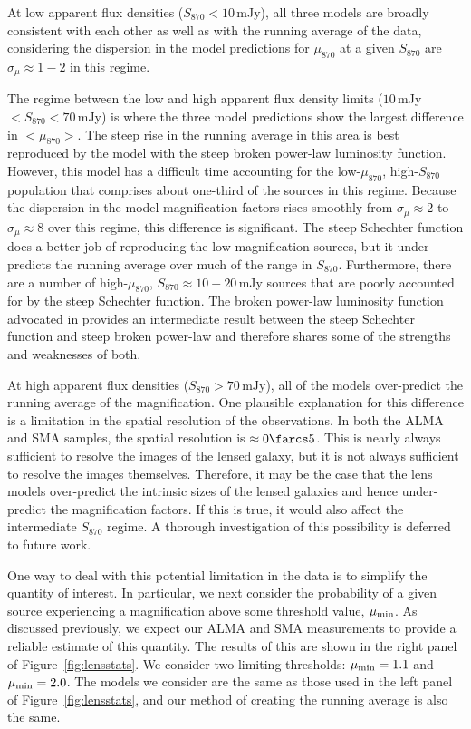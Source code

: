 \documentclass[iop]{emulateapj}
\begin{document}
At low apparent flux densities ($S_{870} < 10\,$mJy), all three models are
broadly consistent with each other as well as with the running average of the
data, considering the dispersion in the model predictions for $\mu_{870}$ at a
given $S_{870}$ are $\sigma_\mu \approx 1-2$ in this regime.  

The regime between the low and high apparent flux density limits ($10\,$mJy$ <
S_{870} < 70\,$mJy) is where the three model predictions show the largest
difference in $<\mu_{870}>$.  The steep rise in the running average in this
area is best reproduced by the model with the steep broken power-law luminosity
function.  However, this model has a difficult time accounting for the
low-$\mu_{870}$, high-$S_{870}$ population that comprises about one-third of
the sources in this regime.  Because the dispersion in the model magnification
factors rises smoothly from $\sigma_\mu \approx 2$ to $\sigma_\mu \approx 8$
over this regime, this difference is significant.  The steep Schechter function
does a better job of reproducing the low-magnification sources, but it
under-predicts the running average over much of the range in $S_{870}$.
Furthermore, there are a number of high-$\mu_{870}$, $S_{870} \approx
10-20\,$mJy sources that are poorly accounted for by the steep Schechter
function.  The broken power-law luminosity function advocated in
\citet{Karim:2013lr} provides an intermediate result between the steep
Schechter function and steep broken power-law and therefore shares some of the
strengths and weaknesses of both.

At high apparent flux densities ($S_{870} > 70\,$mJy), all of the models
over-predict the running average of the magnification.  One plausible
explanation for this difference is a limitation in the spatial resolution of
the observations.  In both the ALMA and SMA samples, the spatial resolution is
$\approx 0\farcs5$.  This is nearly always sufficient to resolve the images of
the lensed galaxy, but it is not always sufficient to resolve the images
themselves.  Therefore, it may be the case that the lens models over-predict
the intrinsic sizes of the lensed galaxies and hence under-predict the
magnification factors.  If this is true, it would also affect the intermediate
$S_{870}$ regime.  A thorough investigation of this possibility is deferred to
future work.  

One way to deal with this potential limitation in the data is to simplify the
quantity of interest.  In particular, we next consider the probability of a
given source experiencing a magnification above some threshold value, $\mu_{\rm
min}$.  As discussed previously, we expect our ALMA and SMA measurements to
provide a reliable estimate of this quantity.  The results of this are shown in
the right panel of Figure~\ref{fig:lensstats}.  We consider two limiting
thresholds: $\mu_{\rm min} = 1.1$ and $\mu_{\rm min} = 2.0$.  The models we
consider are the same as those used in the left panel of
Figure~\ref{fig:lensstats}, and our method of creating the running average is
also the same.
\end{document}
